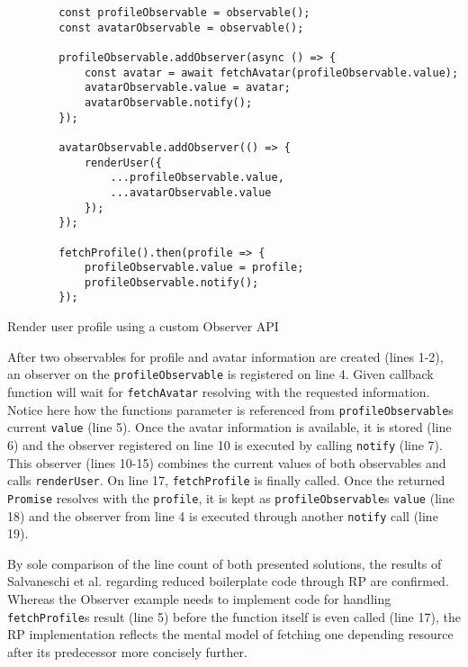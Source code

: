 \documentclass[12pt,a4paper]{article}
\begin{document}
\begin{listing}[H]
	\begin{verbatim}
		const profileObservable = observable();
		const avatarObservable = observable();

		profileObservable.addObserver(async () => {
			const avatar = await fetchAvatar(profileObservable.value);
			avatarObservable.value = avatar;
			avatarObservable.notify();
		});

		avatarObservable.addObserver(() => {
			renderUser({
				...profileObservable.value,
				...avatarObservable.value
			});
		});

		fetchProfile().then(profile => {
			profileObservable.value = profile;
			profileObservable.notify();
		});
	\end{verbatim}
	\caption{Render user profile using a custom Observer API}
	\label{lst:data-flow-observer}
\end{listing}

After two observables for profile and avatar information are created (lines 1-2), an observer on the \texttt{profileObservable} is registered on line 4. Given callback function will wait for \texttt{fetchAvatar} resolving with the requested information. Notice here how the functions parameter is referenced from \texttt{profileObservable}s current \texttt{value} (line 5). Once the avatar information is available, it is stored (line 6) and the observer registered on line 10 is executed by calling \texttt{notify} (line 7). This observer (lines 10-15) combines the current values of both observables and calls \texttt{renderUser}. On line 17, \texttt{fetchProfile} is finally called. Once the returned \texttt{Promise} resolves with the \texttt{profile}, it is kept as \texttt{profileObservable}s \texttt{value} (line 18) and the observer from line 4 is executed through another \texttt{notify} call (line 19).

By sole comparison of the line count of both presented solutions, the results of Salvaneschi et al. \cite{7827078} regarding reduced boilerplate code through RP are confirmed. Whereas the Observer example needs to implement code for handling \texttt{fetchProfile}s result (line 5) before the function itself is even called (line 17), the RP implementation reflects the mental model of fetching one depending resource after its predecessor more concisely further.
\end{document}
